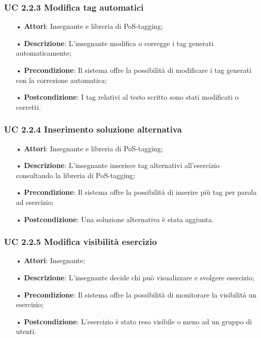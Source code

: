 \subsubsection{UC 2.2.3 Modifica tag automatici}
\begin{itemize}
	\item[•] \textbf{Attori}: Insegnante e libreria di PoS-tagging;
	\item[•] \textbf{Descrizione}: L’insegnante modifica o corregge i tag generati automaticamente;
	\item[•] \textbf{Precondizione}: Il sistema offre la possibilità di modificare i tag generati con la correzione automatica;
	\item[•] \textbf{Postcondizione}: I tag relativi al testo scritto sono stati modificati o corretti.
\end{itemize}
\subsubsection{UC 2.2.4 Inserimento soluzione alternativa}
\begin{itemize}
	\item[•] \textbf{Attori}: Insegnante e libreria di PoS-tagging;
	\item[•] \textbf{Descrizione}: L'insegnante inserisce tag alternativi all’esercizio consultando la libreria di PoS-tagging;
	\item[•] \textbf{Precondizione}: Il sistema offre la possibilità di inserire più tag per parola ad esercizio;
	\item[•] \textbf{Postcondizione}: Una soluzione alternativa è stata aggiunta.
\end{itemize}
\subsubsection{UC 2.2.5 Modifica visibilità esercizio}
\begin{itemize}
	\item[•] \textbf{Attori}: Insegnante;
	\item[•] \textbf{Descrizione}: L'insegnante decide chi può visualizzare e svolgere esercizio;
	\item[•] \textbf{Precondizione}: Il sistema offre la possibilità di monitorare la visibilità un esercizio;
	\item[•] \textbf{Postcondizione}: L’esercizio è stato reso visibile o meno ad un gruppo di utenti.
\end{itemize}
